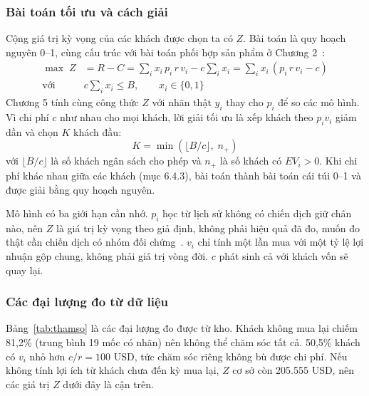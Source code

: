 \subsubsection{Bài toán tối ưu và cách giải}
Cộng giá trị kỳ vọng của các khách được chọn ta có $Z$. Bài toán là quy hoạch nguyên 0--1, cùng cấu trúc với bài toán phối hợp sản phẩm ở Chương 2~\cite{turban2011}:
\begin{align}
    \max\; Z &= R - C = \sum_i x_i\, p_i\, r\, v_i - c \sum_i x_i = \sum_i x_i\,(p_i\, r\, v_i - c) \label{eq:muctieu}\\
    \text{với}\quad & c \sum_i x_i \leq B, \qquad x_i \in \{0,1\} \label{eq:rangbuoc}
\end{align}
Chương 5 tính cùng công thức $Z$ với nhãn thật $y_i$ thay cho $p_i$ để so các mô hình. Vì chi phí $c$ như nhau cho mọi khách, lời giải tối ưu là xếp khách theo $p_i v_i$ giảm dần và chọn $K$ khách đầu:
\begin{equation}
    K = \min\left(\lfloor B/c \rfloor,\; n_+\right) \label{eq:K}
\end{equation}
với $\lfloor B/c \rfloor$ là số khách ngân sách cho phép và $n_+$ là số khách có $EV_i>0$. Khi chi phí khác nhau giữa các khách (mục 6.4.3), bài toán thành bài toán cái túi 0--1 và được giải bằng quy hoạch nguyên.

Mô hình có ba giới hạn cần nhớ. $p_i$ học từ lịch sử không có chiến dịch giữ chân nào, nên $Z$ là giá trị kỳ vọng theo giả định, không phải hiệu quả đã đo, muốn đo thật cần chiến dịch có nhóm đối chứng~\cite{lemmens2020}. $v_i$ chỉ tính một lần mua với một tỷ lệ lợi nhuận gộp chung, không phải giá trị vòng đời. $c$ phát sinh cả với khách vốn sẽ quay lại.

\subsubsection{Các đại lượng đo từ dữ liệu}
Bảng~\ref{tab:thamso} là các đại lượng đo được từ kho. Khách không mua lại chiếm 81,2\% (trung bình 19 mốc có nhãn) nên không thể chăm sóc tất cả. 50,5\% khách có $v_i$ nhỏ hơn $c/r = 100$ USD, tức chăm sóc riêng không bù được chi phí. Nếu không tính lợi ích từ khách chưa đến kỳ mua lại, $Z$ cơ sở còn 205.555 USD, nên các giá trị $Z$ dưới đây là cận trên.

\begin{table}[!htbp]
\centering
\caption{Các đại lượng của mô hình giá trị kỳ vọng đo từ dữ liệu}
\label{tab:thamso}
\footnotesize

\end{table}

